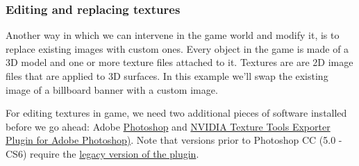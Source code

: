 \documentclass[
  openany]{book}
\begin{document}
\hypertarget{editing-and-replacing-textures}{%
\subsubsection*{Editing and replacing textures}\label{editing-and-replacing-textures}}

Another way in which we can intervene in the game world and modify it, is to replace existing images with custom ones. Every object in the game is made of a 3D model and one or more texture files attached to it. Textures are are 2D image files that are applied to 3D surfaces. In this example we'll swap the existing image of a billboard banner with a custom image.

For editing textures in game, we need two additional pieces of software installed before we go ahead: Adobe \href{https://www.adobe.com/products/photoshop.html}{Photoshop} and \href{https://developer.nvidia.com/nvidia-texture-tools-exporter}{NVIDIA Texture Tools Exporter Plugin for Adobe Photoshop)}. Note that versions prior to Photoshop CC (5.0 - CS6) require the \href{https://developer.nvidia.com/gameworksdownload\#?dn=texture-tools-for-adobe-photoshop-8-55}{legacy version of the plugin}.
\end{document}
